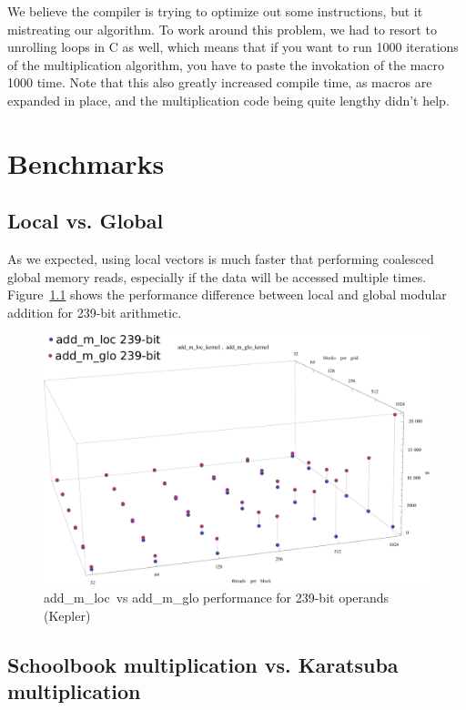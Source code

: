 \documentclass[12pt, a4paper]{report}
\begin{document}
\begin{sloppypar}
We believe the compiler is trying to optimize out some instructions, but it mistreating
our algorithm.
To work around this problem, we had to resort to unrolling loops in C as well, which means that if you want to run
1000 iterations of the multiplication algorithm, you have to paste the invokation of the macro
1000 time.
Note that this also greatly increased compile time, as macros are expanded in place, and the multiplication
code being quite lengthy didn't help.

\chapter{Benchmarks}
\section{Local vs. Global}
As we expected, using local vectors is much faster that performing coalesced global
memory reads, especially if the data will be accessed multiple times.
Figure~\ref{fig:add_m_loc_vs_add_m_glo_kepler_239_duration} shows the performance
difference between local and global modular addition for 239-bit arithmetic.
\begin{figure}[h]
\centering
\includegraphics[scale=0.45]{figs/add_m_loc_vs_add_m_glo_kepler_239_duration}
\caption{add\_m\_loc\ vs add\_m\_glo performance for 239-bit operands (Kepler)}
\label{fig:add_m_loc_vs_add_m_glo_kepler_239_duration}
\end{figure}

\section{Schoolbook multiplication vs. Karatsuba multiplication}

\end{sloppypar}
\end{document}
